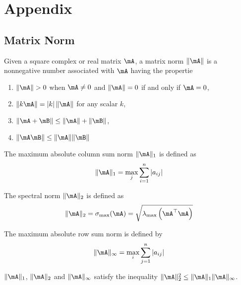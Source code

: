 \documentclass[english,12pt]{book}\usepackage[]{graphicx}\usepackage[]{xcolor}
\begin{document}
\section*{Appendix}
\begin{subappendices}

\section{Matrix Norm}

\begin{definition}
Given a square complex or real matrix $\mA$, a matrix norm $\lVert \mA \rVert$ is a nonnegative number associated with $\mA$ having the propertie
\begin{enumerate}
  \item $\lVert \mA \rVert> 0$ when $\mA\neq 0$ and $\lVert \mA \rVert = 0$ if and only if $\mA = 0$, 
  \item $\lVert k \mA \rVert = \left|k\right|\lVert \mA \rVert$ for any scalar $k$, 
  \item $\lVert \mA  + \mB \rVert \leq \lVert \mA \rVert + \lVert \mB \rVert$, 
  \item $\lVert \mA\mB \rVert \leq \lVert \mA \rVert \lVert \mB \rVert$
\end{enumerate}
\end{definition}

The maximum absolute column sum norm $\lVert \mA \rVert_1$ is defined as
\begin{equation*}
\lVert \mA \rVert_1 = \max_j\sum_{i = 1}^n\left|a_{ij}\right|
\end{equation*}

The spectral norm $\lVert \mA \rVert_2$ is defined as
\begin{equation*}
\lVert \mA \rVert_2 = \sigma_{\max}(\mA) = \sqrt{\lambda_{\max}\left(\mA^\top \mA\right)}
\end{equation*}

The maximum absolute row sum norm is defined by
\begin{equation*}
\lVert \mA \rVert_{\infty} = \max_i\sum_{j = 1}^n\left|a_{ij}\right|
\end{equation*}

$\lVert \mA \rVert_1$, $\lVert \mA \rVert_2$ and $\lVert \mA \rVert_{\infty}$ satisfy the inequality $\lVert \mA \rVert_2^2 \leq \lVert \mA \rVert_1\lVert \mA \rVert_{\infty}$.



\end{subappendices}
\end{document}
